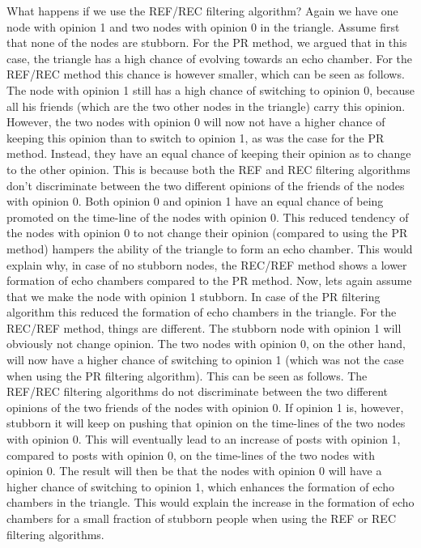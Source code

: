 \documentclass[11 pt , letterpaper , twoside , openright]{book}
\begin{document}
What happens if we use the REF/REC filtering algorithm? Again we have one node with opinion 1 and two nodes with opinion 0 in the triangle. Assume first that none of the nodes are stubborn. For the PR method, we argued that in this case, the triangle has a high chance of evolving towards an echo chamber. For the REF/REC method this chance is however smaller, which can be seen as follows. The node with opinion 1 still has a high chance of switching to opinion 0, because all his friends (which are the two other nodes in the triangle) carry this opinion. However, the two nodes with opinion 0 will now not have a higher chance of keeping this opinion than to switch to opinion 1, as was the case for the PR method. Instead, they have an equal chance of keeping their opinion as to change to the other opinion. This is because both the REF and REC filtering algorithms don't discriminate between the two different opinions of the friends of the nodes with opinion 0. Both opinion 0 and opinion 1 have an equal chance of being promoted on the time-line of the nodes with opinion 0. This reduced tendency of the nodes with opinion 0 to not change their opinion (compared to using the PR method) hampers the ability of the triangle to form an echo chamber. This would explain why, in case of no stubborn nodes, the REC/REF method shows a lower formation of echo chambers compared to the PR method. Now, lets again assume that we make the node with opinion 1 stubborn. In case of the PR filtering algorithm this reduced the formation of echo chambers in the triangle. For the REC/REF method, things are different. The stubborn node with opinion 1 will obviously not change opinion. The two nodes with opinion 0, on the other hand, will now have a higher chance of switching to opinion 1 (which was not the case when using the PR filtering algorithm). This can be seen as follows. The REF/REC filtering algorithms do not discriminate between the two different opinions of the two friends of the nodes with opinion 0. If opinion 1 is, however, stubborn it will keep on pushing that opinion on the time-lines of the two nodes with opinion 0. This will eventually lead to an increase of posts with opinion 1, compared to posts with opinion 0, on the time-lines of the two nodes with opinion 0. The result will then be that the nodes with opinion 0 will have a higher chance of switching to opinion 1, which enhances the formation of echo chambers in the triangle. This would explain the increase in the formation of echo chambers for a small fraction of stubborn people when using the REF or REC filtering algorithms. \\
\end{document}
